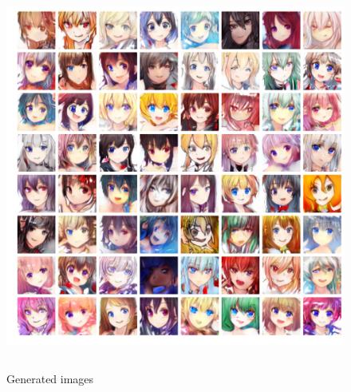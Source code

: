 \documentclass{article}
\begin{document}
\begin{figure}[h]
\centering
\includegraphics[width=5in,height=5in]{result1}
\caption{Generated images}
\end{figure}




\end{document}
